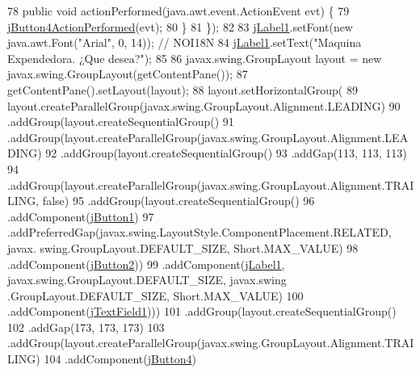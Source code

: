 \begin{DoxyCode}
78             \textcolor{keyword}{public} \textcolor{keywordtype}{void} actionPerformed(java.awt.event.ActionEvent evt) \{
79                 \mbox{\hyperlink{class_interfaz_1_1_ventana_inicial_a5ee4902a6b0e2dcfa91641cdef1b318b}{jButton4ActionPerformed}}(evt);
80             \}
81         \});
82 
83         \mbox{\hyperlink{class_interfaz_1_1_ventana_inicial_a9d48c0b63de7cec55a4caed1f4feb13c}{jLabel1}}.setFont(\textcolor{keyword}{new} java.awt.Font(\textcolor{stringliteral}{"Arial"}, 0, 14)); \textcolor{comment}{// NOI18N}
84         \mbox{\hyperlink{class_interfaz_1_1_ventana_inicial_a9d48c0b63de7cec55a4caed1f4feb13c}{jLabel1}}.setText(\textcolor{stringliteral}{"Maquina Expendedora. ¿Que desea?"});
85 
86         javax.swing.GroupLayout layout = \textcolor{keyword}{new} javax.swing.GroupLayout(getContentPane());
87         getContentPane().setLayout(layout);
88         layout.setHorizontalGroup(
89             layout.createParallelGroup(javax.swing.GroupLayout.Alignment.LEADING)
90             .addGroup(layout.createSequentialGroup()
91                 .addGroup(layout.createParallelGroup(javax.swing.GroupLayout.Alignment.LEADING)
92                     .addGroup(layout.createSequentialGroup()
93                         .addGap(113, 113, 113)
94                         .addGroup(layout.createParallelGroup(javax.swing.GroupLayout.Alignment.TRAILING, \textcolor{keyword}{
      false})
95                             .addGroup(layout.createSequentialGroup()
96                                 .addComponent(\mbox{\hyperlink{class_interfaz_1_1_ventana_inicial_a0c01fdde6aa59c4e947850d3d89ece3a}{jButton1}})
97                                 .addPreferredGap(javax.swing.LayoutStyle.ComponentPlacement.RELATED, javax.
      swing.GroupLayout.DEFAULT\_SIZE, Short.MAX\_VALUE)
98                                 .addComponent(\mbox{\hyperlink{class_interfaz_1_1_ventana_inicial_ac8ea3e51a862b7978b078d694528cdc5}{jButton2}}))
99                             .addComponent(\mbox{\hyperlink{class_interfaz_1_1_ventana_inicial_a9d48c0b63de7cec55a4caed1f4feb13c}{jLabel1}}, javax.swing.GroupLayout.DEFAULT\_SIZE, javax.swing
      .GroupLayout.DEFAULT\_SIZE, Short.MAX\_VALUE)
100                             .addComponent(\mbox{\hyperlink{class_interfaz_1_1_ventana_inicial_a45365129af4acf435140853b35aec365}{jTextField1}})))
101                     .addGroup(layout.createSequentialGroup()
102                         .addGap(173, 173, 173)
103                         .addGroup(layout.createParallelGroup(javax.swing.GroupLayout.Alignment.TRAILING)
104                             .addComponent(\mbox{\hyperlink{class_interfaz_1_1_ventana_inicial_ad0c38a518bd73dd033484143f67a8c2b}{jButton4}})

\end{DoxyCode}
